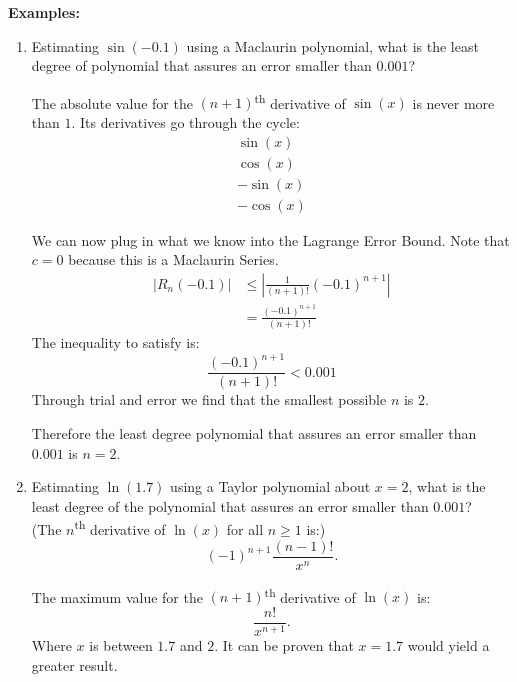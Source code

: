 \documentclass[12pt]{article}
\begin{document}
                \noindent \textbf{Examples:}
                \begin{enumerate}
                    \item Estimating $\sin(-0.1)$ using a Maclaurin polynomial, what is the least degree of polynomial that assures an error smaller than $0.001$?

                    The absolute value for the $(n+1)$\textsuperscript{th} derivative of $\sin(x)$ is never more than $1$. Its derivatives go through the cycle:
                    \begin{gather*}
                        \sin(x) \\
                        \cos(x) \\
                        -\sin(x) \\
                        -\cos(x)
                    \end{gather*}

                    We can now plug in what we know into the Lagrange Error Bound. Note that $c=0$ because this is a Maclaurin Series.
                    \begin{align*}
                        |R_n(-0.1)| &\le \left| \frac{1}{(n+1)!} (-0.1)^{n+1} \right| \\
                        &= \frac{(-0.1)^{n+1}}{(n+1)!}
                    \end{align*}
                    The inequality to satisfy is:
                    \[ \frac{(-0.1)^{n+1}}{(n+1)!} < 0.001 \]
                    Through trial and error we find that the smallest possible $n$ is $2$.

                    Therefore the least degree polynomial that assures an error smaller than $0.001$ is $n=2$.
                    \bigskip

                    \item Estimating $\ln(1.7)$ using a Taylor polynomial about $x=2$, what is the least degree of the polynomial that assures an error smaller than $0.001$?
                    \\ (The $n$\textsuperscript{th} derivative of $\ln(x)$ for all $n \ge 1$ is:)
                    \[ (-1)^{n+1} \frac{(n-1)!}{x^n}. \]

                    The maximum value for the $(n+1)$\textsuperscript{th} derivative of $\ln(x)$ is:
                    \[ \frac{n!}{x^{n+1}}. \]
                    Where $x$ is between $1.7$ and $2$. It can be proven that $x=1.7$ would yield a greater result.


\end{enumerate}
\end{document}
